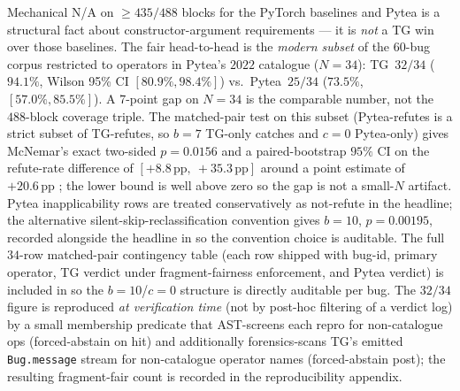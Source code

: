 Mechanical \textsc{N/A} on $\ge 435/488$ blocks for the
PyTorch baselines and Pytea is a structural fact about
constructor-argument requirements --- it is \emph{not} a TG win
over those baselines. The fair head-to-head is the
\emph{modern subset} of the $60$-bug corpus restricted to
operators in Pytea's $2022$ catalogue ($N{=}34$):
\textsc{TG}~$32/34$ ($94.1\%$, Wilson 95\% CI $[80.9\%, 98.4\%]$)
vs.\ Pytea~$25/34$
($73.5\%$, $[57.0\%, 85.5\%]$). A 7-point gap on $N{=}34$ is the comparable
number, not the $488$-block coverage triple. The matched-pair
test on this subset (Pytea-refutes is a strict subset of
TG-refutes, so $b{=}7$ TG-only catches and $c{=}0$ Pytea-only)
gives McNemar's exact two-sided $p{=}0.0156$ and a
paired-bootstrap $95\%$ CI on the refute-rate difference of
$[{+}8.8\,\text{pp},\ {+}35.3\,\text{pp}]$ around a point
estimate of $+20.6\,\text{pp}$
; the lower
bound is well above zero so the gap is not a small-$N$ artifact.
Pytea inapplicability rows are treated conservatively as
not-refute in the headline; the alternative
silent-skip-reclassification convention gives $b{=}10$,
$p{=}0.00195$, recorded alongside the headline in
 so the convention choice is
auditable.
The full $34$-row matched-pair contingency table (each row
shipped with bug-id, primary operator, TG verdict under
fragment-fairness enforcement, and Pytea verdict) is included in
 so the $b{=}10$/$c{=}0$ structure is
directly auditable per bug.
The $32/34$ figure is reproduced \emph{at verification time}
(not by post-hoc filtering of a verdict log) by a small membership
predicate that AST-screens each repro for non-catalogue ops
(forced-abstain on hit) and additionally forensics-scans
TG's emitted \texttt{Bug.message} stream for non-catalogue
operator names (forced-abstain post); the resulting
fragment-fair count is recorded in the reproducibility appendix.

